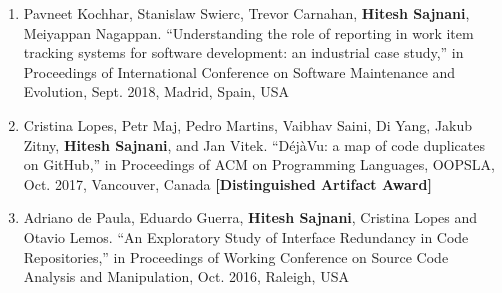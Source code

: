 \documentclass[letterpaper,11pt]{article}
\begin{document}
\begin{enumerate}

\item\small{Pavneet Kochhar, Stanislaw Swierc, Trevor Carnahan, \textbf{Hitesh Sajnani}, Meiyappan Nagappan. “Understanding the role of reporting in work item tracking systems for software development: an industrial case study,” in Proceedings of International Conference on Software Maintenance and Evolution, Sept. 2018, Madrid, Spain, USA  }

 \vspace{-1pt}\item\small{Cristina Lopes, Petr Maj, Pedro Martins, Vaibhav Saini, Di Yang, Jakub Zitny, \textbf{Hitesh Sajnani}, and Jan Vitek. “DéjàVu: a map of code duplicates on GitHub,” in Proceedings of ACM on Programming Languages, OOPSLA, Oct. 2017, Vancouver, Canada \textbf{[Distinguished Artifact Award]}  }

 \vspace{-1pt}\item\small{Adriano de Paula, Eduardo Guerra, \textbf{Hitesh Sajnani}, Cristina Lopes and Otavio Lemos. “An Exploratory Study of Interface Redundancy in Code Repositories,” in Proceedings of Working Conference on Source Code Analysis and Manipulation, Oct. 2016, Raleigh, USA  }


\end{enumerate}
\end{document}
